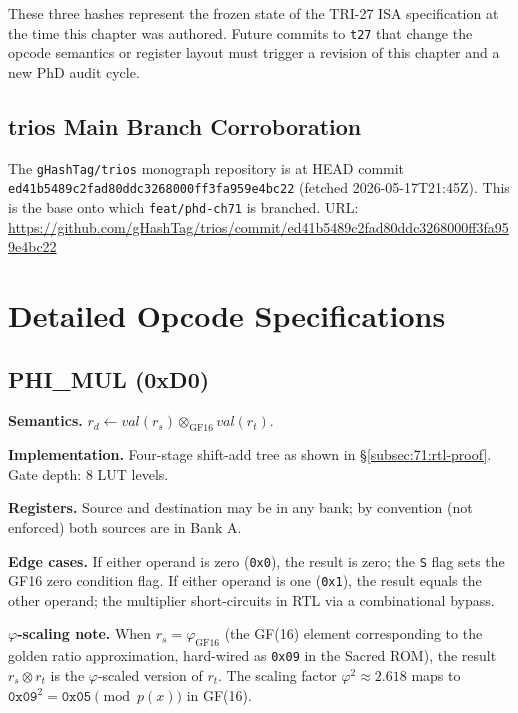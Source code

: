 These three hashes represent the frozen state of the TRI-27 ISA
specification at the time this chapter was authored.  Future commits
to \texttt{t27} that change the opcode semantics or register layout
must trigger a revision of this chapter and a new PhD audit cycle.

\subsection{trios Main Branch Corroboration}
\label{subsec:71:trios-corroboration}

The \texttt{gHashTag/trios} monograph repository is at HEAD commit
\texttt{ed41b5489c2fad80ddc3268000ff3fa959e4bc22} (fetched
2026-05-17T21:45Z).  This is the base onto which
\texttt{feat/phd-ch71} is branched.
URL: \url{https://github.com/gHashTag/trios/commit/ed41b5489c2fad80ddc3268000ff3fa959e4bc22}

\section{Detailed Opcode Specifications}
\label{sec:71:opcode-specs}

\subsection{PHI\_MUL (0xD0)}
\label{subsec:71:phi-mul}

\textbf{Semantics.} $r_d \leftarrow \mathit{val}(r_s) \otimes_{\mathrm{GF}16} \mathit{val}(r_t)$.

\textbf{Implementation.} Four-stage shift-add tree as shown in
\S\ref{subsec:71:rtl-proof}.  Gate depth: 8 LUT levels.

\textbf{Registers.} Source and destination may be in any bank; by
convention (not enforced) both sources are in Bank A.

\textbf{Edge cases.} If either operand is zero (\texttt{0x0}), the
result is zero; the \texttt{S} flag sets the GF16 zero condition flag.
If either operand is one (\texttt{0x1}), the result equals the other
operand; the multiplier short-circuits in RTL via a combinational
bypass.

\textbf{$\varphi$-scaling note.} When $r_s = \varphi_{\mathrm{GF16}}$
(the GF(16) element corresponding to the golden ratio approximation,
hard-wired as \texttt{0x09} in the Sacred ROM), the result
$r_s \otimes r_t$ is the $\varphi$-scaled version of $r_t$.
The scaling factor $\varphi^2 \approx 2.618$ maps to
$\texttt{0x09}^2 = \texttt{0x05} \pmod{p(x)}$ in GF(16).

